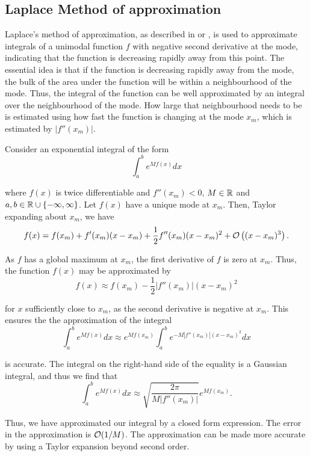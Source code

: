 \subsection{Laplace Method of approximation}
\label{sec:laplace_approximation}

Laplace's method of approximation, as described in \cite{butler_2007} or
\cite{MacKay:2002:ITI:971143}, is used to approximate integrals of a unimodal
function $f$ with negative second derivative at the mode, indicating that the
function is decreasing rapidly away from this point. The essential idea is that
if the function is decreasing rapidly away from the mode, the bulk of the area
under the function will be within a neighbourhood of the mode. Thus, the integral
of the function can be well approximated by an integral over the neighbourhood
of the mode. How large that neighbourhood needs to be is estimated using how
fast the function is changing at the mode $x_m$, which is estimated by
$|f''(x_m)|$.

Consider an exponential integral of the form
$$
	\int_a^b e^{M f(x)} dx
$$

\noindent where $f(x)$ is twice differentiable and $f''(x_m) < 0$, $M \in {\mathbb{R}}$
and $a, b \in {\mathbb{R}} \cup \{-\infty, \infty\}$. Let $f(x)$ have a unique mode at
$x_m$. Then, Taylor expanding about $x_m$, we have
$$
	f(x) = f(x_m) + f'(x_m) (x - x_m) + \frac{1}{2} f''(x_m) (x - x_m)^2 + \mathcal{O}\left((x - x_m)^3\right).
$$

\noindent As $f$ has a global maximum at $x_m$, the first derivative of $f$ is
zero at $x_m$. Thus, the function $f(x)$ may be approximated by
$$
	f(x) \approx f(x_m) - \frac{1}{2} |f''(x_m)| (x - x_m)^2
$$

\noindent for $x$ sufficiently close to $x_m$, as the second derivative is
negative at $x_m$. This ensures the the approximation of the integral
$$
	\int_a^b e^{M f(x)} dx \approx e^{M f(x_m)} \int_a^b e^{-M |f''(x_m)|(x - x_m)^2} dx
$$

\noindent is accurate. The integral on the right-hand side of the equality is a
Gaussian integral, and thus we find that
$$
	\int_a^b e^{M f(x)} dx \approx \sqrt{\frac{2 \pi}{M |f''(x_m)|}} e^{M f(x_m)}.
$$

\noindent Thus, we have approximated our integral by a closed form expression.
The error in the approximation is $\mathcal{O}(1/M)$. The approximation can be made
more accurate by using a Taylor expansion beyond second order.

